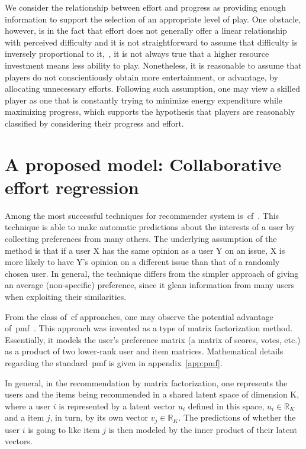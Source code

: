 We consider the relationship between effort and progress as providing enough information to support the selection of an appropriate level of play. One obstacle, however, is in the fact that effort does not generally offer a linear relationship with perceived difficulty and it is not straightforward to assume that difficulty is inversely proportional to it,~\ie, it is not always true that a higher resource investment means less ability to play. 
Nonetheless, it is reasonable to assume that players do not conscientiously obtain more entertainment, or advantage, by allocating unnecessary efforts. Following such assumption, one may view a skilled player as one that is constantly trying to minimize energy expenditure while maximizing progress, which supports the hypothesis that players are reasonably classified by considering their progress and effort.

\section{A proposed model: Collaborative effort regression}

Among the most successful techniques for recommender system is~\gls{cf}~\citep{su_survey_2009, schafer_collaborative_2007}. 
This technique is able to make automatic predictions about the interests of a user by collecting preferences from many others. The underlying assumption of the method is that if a user X has the same opinion as a user Y on an issue, X is more likely to have Y's opinion on a different issue than that of a randomly chosen user. In general, the technique differs from the simpler approach of giving an average (non-specific) preference, since it glean information from many users when exploiting their similarities.

From the class of~\gls{cf} approaches, one may observe the potential advantage of~\gls{pmf}~\citep{mnih_probabilistic_2008}. This approach was invented as a type of matrix factorization method. Essentially, it models the user's preference matrix (a matrix of scores, votes, etc.) as a product of two lower-rank user and item matrices. Mathematical details regarding the standard~\gls{pmf} is given in appendix~\ref{app:pmf}. 

In general, in the recommendation by matrix factorization, one represents the users and the items being recommended in a shared latent space of dimension K, where a user $i$ is represented by a latent vector $u_{i}$ defined in this space, \ie $u_{i} \in \mathbb{R}_{K}$ and a item $j$, in turn, by its own vector $v_{j} \in \mathbb{R}_{K}$. The predictions of whether the user $i$ is going to like item $j$ is then modeled by the inner product of their latent vectors.

